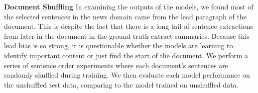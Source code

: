\textbf{Document Shuffling} In examining the outputs of the models, we found
most of the selected sentences in the news domain came from the lead paragraph
of the document. This is despite the fact that there is a long tail of 
sentence extractions from later in the document in the ground truth extract 
summaries. Because this lead bias is so strong, it is questionable whether
the models are learning to identify important content or just find the start
of the document. We perform a series of sentence order experiments where 
each document's sentences are randomly shuffled during training. We then
evaluate each model performance on the unshuffled test data, comparing to 
the model trained on unshuffled data. 






